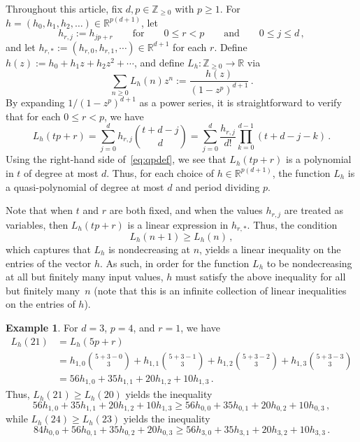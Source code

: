 \documentclass[12pt]{amsart}
\theoremstyle{definition}
\newtheorem{example}[thm]{Example}
\numberwithin{equation}{section}
\renewcommand\>{\rangle}
\newcommand\<{\langle}
\newcommand\0{\mathbf{0}}
\newcommand\RR{\mathbb{R}}
\newcommand\ZZ{\mathbb{Z}}
\begin{document}
Throughout this article, fix $d, p \in \ZZ_{\ge 0}$ with $p \ge 1$.  
For $h = (h_0, h_1, h_2, \ldots)\in \RR^{p(d+1)}$, let 
\[
h_{r,j} := h_{jp + r}
\qquad \text{for} \qquad
0 \le r < p
\qquad \text{and} \qquad
0 \le j \le d \, ,
\]
and let $h_{r,*} := (h_{r,0}, h_{r,1}, \cdots) \in \RR^{d+1}$ for each $r$.
Define $h(z) := h_0 + h_1z + h_2z^2 + \cdots$, and define $L_h:\ZZ_{\ge 0} \to \RR$ via
\[
\sum_{n \ge 0} L_h(n) z^n
:= \frac{h(z)}{(1-z^p)^{d+1}}\, .
\]
By expanding $1/(1-z^p)^{d+1}$ as a power series, it is straightforward to verify that for each $0\leq r<p$, we have 
\begin{equation}
L_h(tp + r) = \sum_{j = 0}^d h_{r,j} \binom{t+d-j}{d}= \sum_{j = 0}^d  \frac{h_{r,j}}{d!}\prod_{k=0}^{d-1}(t+d-j-k)\, . \label{eq:qpdef} 
\end{equation}
Using the right-hand side of~\eqref{eq:qpdef}, we see that $L_h(tp+r)$ is a polynomial in $t$ of degree at most $d$.
Thus, for each choice of $h\in \RR^{p(d+1)}$,  the function $L_h$ is a quasi-polynomial of degree at most $d$ and period dividing $p$.

Note that when $t$ and $r$ are both fixed, and when the values $h_{r,j}$ are treated as variables, then $L_h(tp+r)$ is a linear expression in $h_{r,*}$.
Thus, the condition 
\[
L_h(n+1) \ge L_h(n) \, ,
\]
which captures that $L_h$ is nondecreasing at $n$, yields a linear inequality on the entries of the vector $h$.
As such, in order for the function $L_h$ to be nondecreasing at all but finitely many input values, $h$ must satisfy the above inequality for all but finitely many~$n$ (note that this is an infinite collection of linear inequalities on the entries of $h$).  

\begin{example}
\label{ex:hlinear}
For $d=3$, $p=4$, and $r=1$, we have
\begin{align*}
L_h(21) & = L_h(5p+r)
\\
&=h_{1,0}\binom{5+3-0}{3}+h_{1,1}\binom{5+3-1}{3}+h_{1,2}\binom{5+3-2}{3}+h_{1,3}\binom{5+3-3}{3} \\
&= 56h_{1,0}+35h_{1,1}+20h_{1,2}+10h_{1,3}\, . 
\end{align*}
Thus, $L_h(21)\geq L_h(20)$ yields the inequality
\[
56h_{1,0}+35h_{1,1}+20h_{1,2}+10h_{1,3}\geq 56h_{0,0}+35h_{0,1}+20h_{0,2}+10h_{0,3}\, ,
\]
while  $L_h(24)\geq L_h(23)$ yields the inequality
\[
84h_{0,0}+56h_{0,1}+35h_{0,2}+20h_{0,3}\geq 56h_{3,0}+35h_{3,1}+20h_{3,2}+10h_{3,3}\, .
\]
\end{example}
\end{document}
